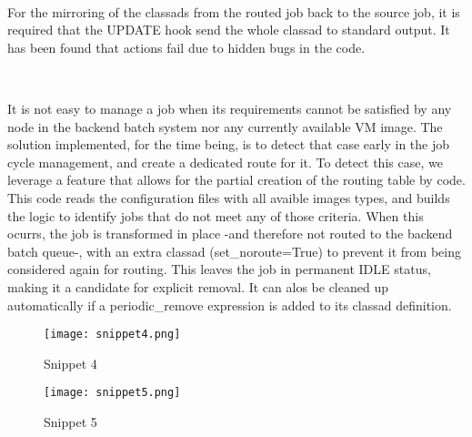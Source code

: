 \documentclass[a4paper]{jpconf}
\begin{document}
~

For the mirroring of the classads from the routed job back to the source job, 
it is required that the UPDATE hook send the whole classad to standard output. 
It has been found that actions fail due to hidden bugs in the code. 

~

It is not easy to manage a job when its requirements cannot be satisfied by any
node in the backend batch system nor any currently available VM image. 
The solution implemented, for the time being, is to detect that case early in
the job cycle management, and create a dedicated route for it. 
To detect this case, we leverage a feature that allows for the partial creation of the routing table by code.
This code reads the configuration files with all avaible images types, and builds the logic to identify jobs that do not meet any of those criteria. 
When this ocurrs, the job is transformed in place -and therefore not routed to
the backend batch queue-, with an extra classad (set\_noroute=True) to prevent it from being considered again for routing.
This leaves the job in permanent IDLE status, making it a candidate for
explicit removal. It can alos be cleaned up automatically if a
periodic\_remove expression is added to its classad definition.

\begin{figure}[h]
    \centering
    \texttt{[image: snippet4.png]}
    \caption{Snippet 4}
    \label{fig:snippet4}
\end{figure}


\begin{figure}[h]
    \centering
    \texttt{[image: snippet5.png]}
    \caption{Snippet 5}
    \label{fig:snippet5}
\end{figure}
\end{document}
